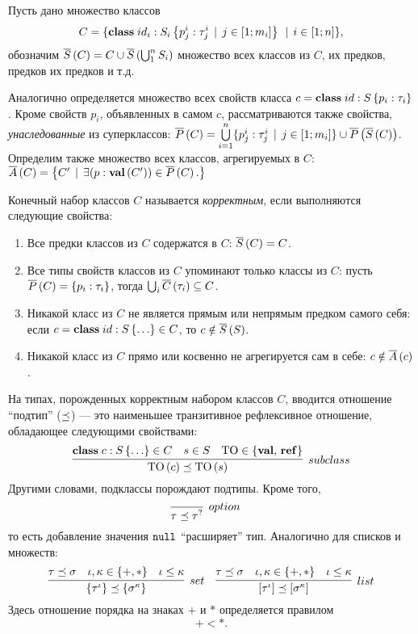 Пусть дано множество классов 
$$
C = \{\mathbf{class}\;id_i : S_i \left\{p^i_j : \tau^i_j \;\,|\;\, j \in [1;m_i]\right\}\;\,|\;\, i \in [1;n]\},
$$
обозначим $\overline{S}\left(C\right) = C \cup \overline{S}\left(\bigcup_1^n S_i\right)$ множество всех классов из $C$, их предков, предков их предков и т.д.

Аналогично определяется множество всех свойств класса $c = \mathbf{class}\;id : S \left\{p_i : \tau_i\right\}$. Кроме свойств $p_i$, объявленных в самом $c$, рассматриваются также свойства, \emph{унаследованные} из суперклассов:  $\overline{P}\left(C\right) = \bigcup\limits_{i = 1}^n\{p^i_j : \tau^i_j \;\,|\;\, j \in [1;m_i]\} \cup \overline{P}\left(\overline{S}\left(C\right)\right)$.
Определим также множество всех классов, агрегируемых в $C$: 
$
\overline{A}\left(C\right) = \left\{
C' \;\,|\;\, \exists (p : \mathbf{val}\left(C'\right)) \in \overline{P}\left(C\right).
\right\}
$ 

\begin{Def}
Конечный набор классов $C$ называется \emph{корректным}, если выполняются следующие свойства:
\begin{enumerate}
\item Все предки классов из $C$ содержатся в $C$: $\overline{S}\left(C\right) = C$.
\item Все типы свойств классов из $C$ упоминают только классы из $C$: пусть $\overline{P}\left(C\right) = \left\{p_i : \tau_i\right\}$, тогда $\bigcup_i \overline{C}\left(\tau_i\right) \subseteq C$.
\item Никакой класс из $C$ не является прямым или непрямым предком самого себя: если $c = \mathbf{class}\;id : S \left\{\ldots\right\} \in C$, то $c \notin \overline{S}\left(S\right)$.
\item Никакой класс из $C$ прямо или косвенно не агрегируется сам в себе: $c \notin \overline{A}\left(c\right)$.
\end{enumerate}
\end{Def}

На типах, порожденных корректным набором классов $C$, вводится отношение ``подтип'' ($\preceq$) --- это наименьшее транзитивное рефлексивное отношение, обладающее следующими свойствами:
$$
\infer[subclass]{
\type{\mbox{TO}}{c} \subtype \type{\mbox{TO}}{s}
}{
	\Class{c}{S}{\ldots} \in C &
	s \in S & 
	\mbox{TO} \in \{\valts,\, \refts\}
}
$$  
Другими словами, подклассы порождают подтипы. Кроме того, 
$$
\infer[option]{
	\tau \subtype \NullableT{\tau}
}{}
\quad
$$
\noindent то есть добавление значения $\mathtt{null}$ ``расширяет'' тип. Аналогично для списков и множеств:
 $$
\infer[set]{
	\SetT{\tau^\iota} \subtype \SetT{\sigma^\kappa}
}{
	\tau \subtype \sigma &
	\iota, \kappa \in \{+, *\} &
	\iota \le \kappa
}
\quad
\infer[list]{
	\ListT{\tau^\iota} \subtype \ListT{\sigma^\kappa}
}{
	\tau \subtype \sigma &
	\iota, \kappa \in \{+, *\} &
	\iota \le \kappa
}
$$
Здесь отношение порядка на знаках $+$ и $*$ определяется правилом $$+ < *.$$

